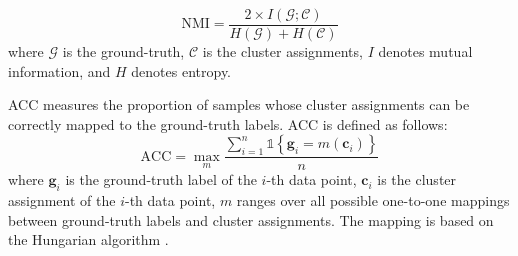 \begin{equation}
	\mbox{NMI} = \frac{2\times I(\mathcal{G};\mathcal{C})}{H(\mathcal{G})+H(\mathcal{C})}
\end{equation}
where $\mathcal{G}$ is the ground-truth, $\mathcal{C}$ is the cluster assignments, $I$ denotes mutual information, and $H$ denotes entropy.

ACC measures the proportion of samples whose cluster assignments can be correctly mapped to the ground-truth labels. ACC is defined as follows:
\begin{equation}
	\mbox{ACC} = \max_m \frac{\sum_{i = 1}^n \mathds{1}\left\{ \mathbf{g}_i = m\left( \mathbf{c}_i \right) \right\} }{n}
\end{equation}
where $\mathbf{g}_i$ is the ground-truth label of the $i$-th data point, $\mathbf{c}_i$ is the cluster assignment of the $i$-th data point, $m$ ranges over all possible one-to-one mappings between ground-truth labels and cluster assignments. The mapping is based on the Hungarian algorithm \cite{kuhn2005hungarian}. 

